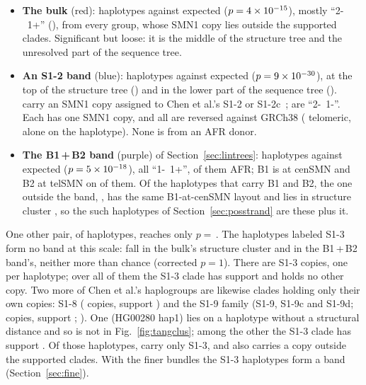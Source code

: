 \begin{itemize}
\item \textbf{The bulk} (red): \cbBulkn{} haplotypes against \cbBulkexp{} expected ($p=4\times10^{-15}$), mostly ``2-~1+''
(\cbBulktopArr), from every group, whose SMN1 copy lies outside the supported clades. Significant but loose: it is
the middle of the structure tree and the unresolved part of the sequence tree.
\item \textbf{An S1-2 band} (blue): \cbTwon{} haplotypes against \cbTwoexp{} expected ($p=9\times10^{-30}$), at the top of
the structure tree (\cbTwoposS) and in the lower part of the sequence tree (\cbTwoposG). \cbTwohg{} carry an SMN1 copy
assigned to Chen et al.'s S1-2 or S1-2c~\cite{chen2023}; \cbTwotopArr{} are ``2-~1-''. Each has one SMN1 copy, and all
\cbTworev{} are reversed against GRCh38 (\cbTwotel{} telomeric, \cbTwosingle{} alone on the haplotype). None is from an
AFR donor.
\item \textbf{The B1\,+\,B2 band} (purple) of Section~\ref{sec:lintrees}: \cbABn{} haplotypes against \cbABexp{} expected
($p=5\times10^{-18}$), all ``1-~1+'', \cbABafr{} of them AFR; B1 is at cenSMN and B2 at telSMN on \cbABcen{} of them. Of the \linMixHaps{} haplotypes that carry B1 and B2, the one outside the band, \cbABoutNames, has the same B1-at-cenSMN layout and lies in structure cluster \cbABoutClu, so the \linMixBoneCenRev{} such haplotypes of Section~\ref{sec:posstrand} are these \cbABcen{} plus it.
\end{itemize}
One other pair, of \mlbSmallOv{} haplotypes, reaches only $p=$\,\mlbSmallP. The \cbSThreeN{} haplotypes labeled S1-3
form no band at this scale: \cbSThreeBulk{} fall in the bulk's structure cluster and \cbSThreeAB{} in the B1\,+\,B2
band's, neither more than chance (corrected $p=1$). There are \mlThreeN{} S1-3 copies, one per haplotype; over all of them the S1-3 clade has support \mlThreeSup{} and holds no other copy. Two more of Chen et al.'s haplogroups are likewise clades holding only their own copies: S1-8 (\mlEightCladeN{} copies, support \mlEightCladeSup) and the S1-9 family (S1-9, S1-9c and S1-9d; \mlNineFamN{} copies, support \mlNineFamSup; ). One (HG00280
hap1) lies on a haplotype without a structural distance and so is not in Fig.~\ref{fig:tangclus}; among the other
\mlbThreeTree{} the S1-3 clade has support \mlbThreeSup. Of those \mlbThreeTree{} haplotypes, \mlbThreeOnly{} carry only S1-3,
and \mlbThreePlus{} also carries a copy outside the supported clades. With the finer bundles the S1-3 haplotypes form a band (Section~\ref{sec:fine}).

